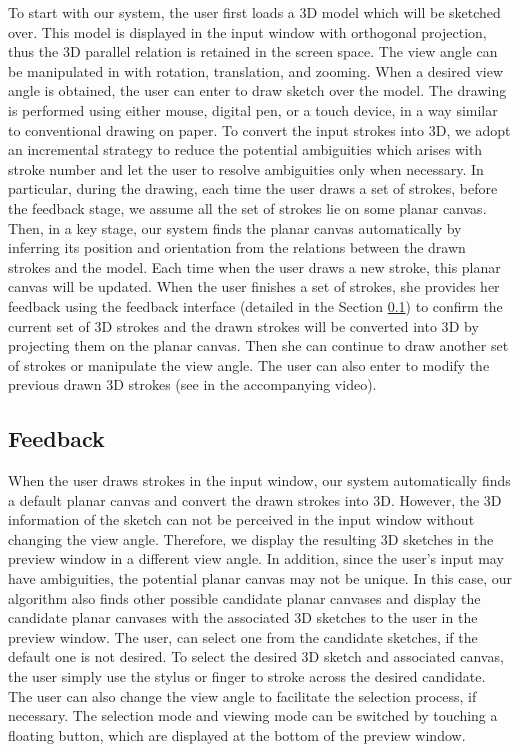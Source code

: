 To start with our system, the user first loads a 3{D} model which will be sketched over. This model is displayed in the input window with orthogonal projection, thus the 3D parallel relation is retained in the screen space. The view angle can be manipulated in  with rotation, translation, and zooming. When a desired view angle is obtained, the user can  enter  to draw sketch over the model. The drawing is performed using either mouse, digital pen, or a touch device, in a way similar to conventional drawing on paper. To convert the input strokes into 3D, we adopt an incremental strategy to reduce the potential ambiguities which arises with stroke number and let the user to resolve ambiguities only when necessary. In particular, during the drawing, each time the user draws a set of strokes, before the feedback stage, we assume all the set of strokes lie on some planar canvas. Then, in a key stage, our system finds the planar canvas automatically by inferring its position and orientation from the relations between the drawn strokes and the model. Each time when the user draws a new stroke, this planar canvas will be updated. When the user finishes a set of strokes, she provides her feedback using the feedback interface (detailed in the Section \ref{sec:feedback}) to confirm the current set of 3{D} strokes and the drawn strokes will be converted into 3{D} by projecting them on the planar canvas. Then she can continue to draw another set of strokes or manipulate the view angle. The user can also enter  to modify the previous drawn 3D strokes (see in the accompanying video).


\subsection{Feedback}\label{sec:feedback}
When the user draws strokes in the input window, our system automatically finds a default planar canvas and convert the drawn strokes into 3{D}. However, the 3{D} information of the sketch can not be perceived in the input window without changing the view angle. Therefore, we display the resulting 3{D} sketches in the preview window in a different view angle. In addition, since the user's input may have ambiguities, the potential planar canvas may not be unique. In this case, our algorithm also finds other possible candidate planar canvases and display the candidate planar canvases with the associated 3{D} sketches to the user in the preview window. The user, can select one from the candidate sketches, if the default one is not desired. To select the desired 3D sketch and associated canvas, the user simply use the stylus or finger to stroke across the desired candidate.  The user can also change the view angle to facilitate the selection process, if necessary. The selection mode and viewing mode can be switched by touching a floating button, which are displayed at the bottom of the preview window.

